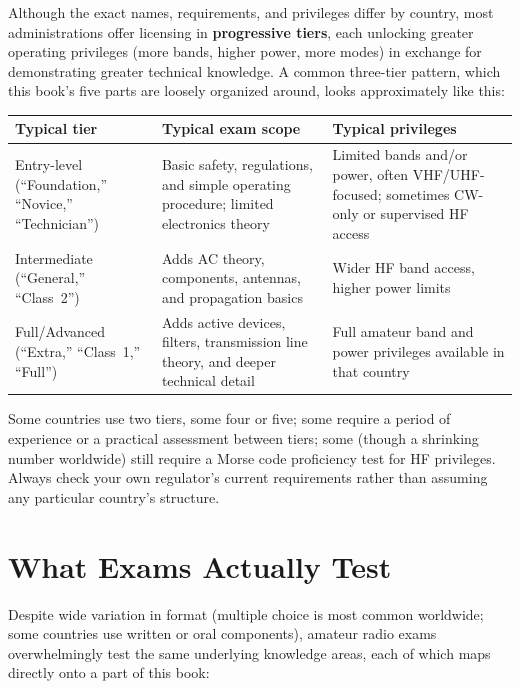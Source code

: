 Although the exact names, requirements, and privileges differ by
country, most administrations offer licensing in \textbf{progressive
tiers}, each unlocking greater operating privileges (more bands, higher
power, more modes) in exchange for demonstrating greater technical
knowledge. A common three-tier pattern, which this book's five parts are
loosely organized around, looks approximately like this:

\begin{center}
\renewcommand{\arraystretch}{1.3}
\begin{tabularx}{\linewidth}{@{}p{3.1cm} Y Y@{}}
\toprule
Typical tier & Typical exam scope & Typical privileges \\
\midrule
Entry-level (``Foundation,'' ``Novice,'' ``Technician'') &
Basic safety, regulations, and simple operating procedure; limited
electronics theory &
Limited bands and/or power, often VHF/UHF-focused; sometimes CW-only or
supervised HF access \\
Intermediate (``General,'' ``Class~2'') &
Adds AC theory, components, antennas, and propagation basics &
Wider HF band access, higher power limits \\
Full/Advanced (``Extra,'' ``Class~1,'' ``Full'') &
Adds active devices, filters, transmission line theory, and deeper
technical detail &
Full amateur band and power privileges available in that country \\
\bottomrule
\end{tabularx}
\end{center}

Some countries use two tiers, some four or five; some require a period
of experience or a practical assessment between tiers; some (though a
shrinking number worldwide) still require a Morse code proficiency
test for HF privileges. Always check your own regulator's current
requirements rather than assuming any particular country's structure.

\section{What Exams Actually Test}

Despite wide variation in format (multiple choice is most common
worldwide; some countries use written or oral components), amateur
radio exams overwhelmingly test the same underlying knowledge areas,
each of which maps directly onto a part of this book:

